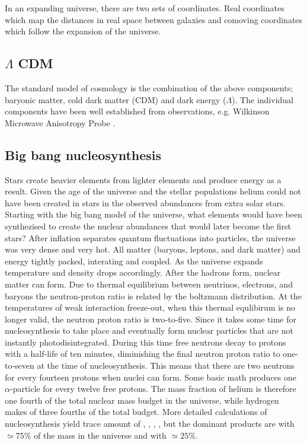 In an expanding universe, there are two sets of coordinates. Real coordinates which map the distances in real space between galaxies and comoving coordinates which follow the expansion of the universe.

\subsection{$\Lambda$ CDM}
The standard model of cosmology is the combination of the above components; baryonic matter, cold dark matter (CDM) and dark energy ($\Lambda$). The individual components have been well established from observations, e.g. Wilkinson Microwave Anisotropy Probe .

\subsection{Big bang nucleosynthesis}
Stars create heavier elements from lighter elements and produce energy as a result. Given the age of the universe and the stellar populations helium could not have been created in stars in the observed abundances from extra solar stars.
Starting with the big bang model of the universe, what elements would have been synthezised to create the nuclear abundances that would later become the first stars?
After inflation separates quantum fluctuations into particles, the universe was very dense and very hot. All matter (baryons, leptons, and dark matter) and energy tightly packed, interating and coupled. As the universe expands temperature and density drops accordingly.
After the hadrons form, nuclear matter can form.
Due to thermal equilibrium between neutrinos, electrons, and baryons the neutron-proton ratio is related by the boltzmann distribution. At the temperatures of weak interaction freeze-out, when this thermal equlibirum is no longer valid, the neutron proton ratio is two-to-five.
Since it takes some time for nucleosynthesis to take place and eventually form nuclear particles that are not instantly photodisintegrated.
During this time free neutrons decay to protons with a half-life of ten minutes, diminishing the final neutron proton ratio to one-to-seven at the time of nucleosynthesis. This means that there are two neutrons for every fourteen protons when nuclei can form.
Some basic math produces one $\alpha$-particle for every twelve free protons. The mass fraction of helium is therefore one fourth of the total nuclear mass budget in the universe, while hydrogen makes of three fourths of the total budget.
More detailed calculations of nucleosynthesis yield trace amount of , , , , but the dominant products are  with $\simeq75\%$ of the mass in the universe and  with $\simeq25\%$.

\FloatBarrier
